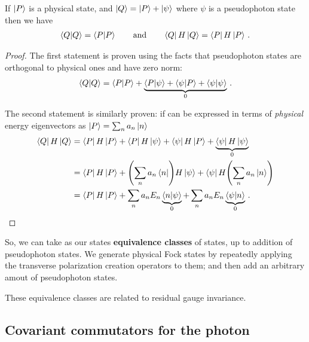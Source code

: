 \documentclass[main.tex]{subfiles}
\begin{document}

\begin{claim}
If \(\ket{P}\) is a physical state, and \(\ket{Q} = \ket{P} + \ket{\psi }\) where \(\psi \) is a pseudophoton state then we have 
%
\begin{align}
\braket{Q}{Q} = \braket{P}{P} 
\qquad \text{and} \qquad
\bra{Q} H \ket{Q} = \bra{P} H \ket{P}
\,.
\end{align}
\end{claim}

\begin{proof}
The first statement is proven using the facts that pseudophoton states are orthogonal to physical ones and have zero norm: 
%
\begin{align}
\braket{Q}{Q} = \braket{P}{P} +
\underbrace{\braket{P}{\psi } +\braket{\psi }{P} + \braket{\psi }{\psi }}_{0}
\,.
\end{align}

The second statement is similarly proven: if can be expressed in terms of \emph{physical} energy eigenvectors as \(\ket{P} = \sum _{n} a_n\ket{n}\)
%
\begin{align}
\bra{Q} H \ket{Q} &= 
\bra{P} H \ket{P} 
+ \bra{P} H \ket{\psi }
+ \bra{\psi } H \ket{P }
+ \underbrace{\bra{\psi } H \ket{\psi }}_{0}  \\
&= 
\bra{P} H \ket{P} 
+ \qty(\sum _{n} a_n \bra{n}) H \ket{\psi }
+ \bra{\psi } H \qty(\sum _{n} a_n \ket{n})  \\
&= \bra{P} H \ket{P} 
+ \sum _{n} a_n E_n \underbrace{\braket{n}{\psi }}_{0}
+ \sum _{n} a_n E_n \underbrace{\braket{\psi }{n }}_{0}
\,.
\end{align}
\end{proof}

So, we can take as our states \textbf{equivalence classes} of states, up to addition of pseudophoton states. 
We generate physical Fock states by repeatedly applying the transverse polarization creation operators to them; and then add an arbitrary amout of pseudophoton states. 

\begin{claim}
These equivalence classes are related to residual gauge invariance.  
\end{claim} 

\subsection{Covariant commutators for the photon}
\end{document}
